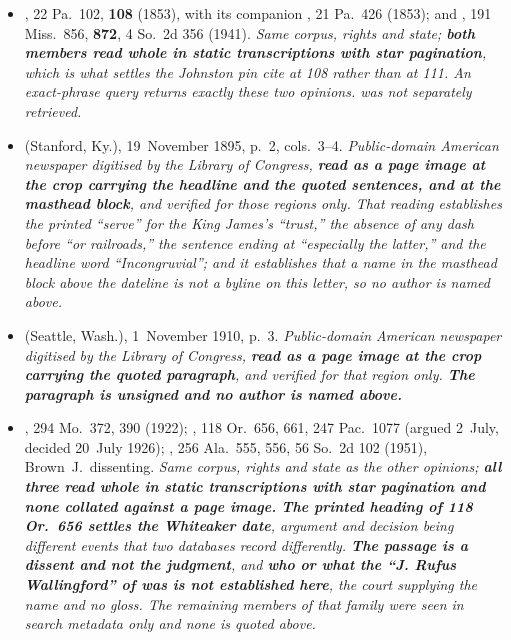 \begin{itemize}[leftmargin=1.2em, itemsep=0.15em]
{Hare and Wallace's Notes to 1  p.~210 are cited
above as the sources those opinions quote and were not separately retrieved.
\textbf{The corpus is overwhelmingly American and no Commonwealth sweep was
performed}; the further opinions quoting the mammon clause were seen in search
metadata only and none is quoted above.}
\item {}, 22 Pa.\ 102, \textbf{108} (1853),
with its companion , 21 Pa.\ 426 (1853); and
, 191 Miss.\ 856, \textbf{872}, 4 So.\ 2d 356 (1941).
\textit{Same corpus, rights and state; \textbf{both members read whole in static
transcriptions with star pagination}, which is what settles the Johnston pin
cite at 108 rather than at 111. An exact-phrase query returns exactly these two
opinions.  was not separately retrieved.}
\item {} (Stanford, Ky.), 19~November 1895,
p.~2, cols.~3--4. \textit{Public-domain American newspaper digitised by the
Library of Congress, \textbf{read as a page image at the crop carrying the
headline and the quoted sentences, and at the masthead block}, and
\emph{verified} for those regions only. That reading establishes the printed
``serve'' for the King James's ``trust,'' the absence of any dash before ``or
railroads,'' the sentence ending at ``especially the latter,'' and the headline
word ``Incongruvial''; and it establishes that a name in the masthead block
above the dateline is not a byline on this letter, so no author is named above.}
\item {} (Seattle, Wash.), 1~November 1910, p.~3.
\textit{Public-domain American newspaper digitised by the Library of Congress,
\textbf{read as a page image at the crop carrying the quoted paragraph}, and
\emph{verified} for that region only. \textbf{The paragraph is unsigned and no
author is named above.}}
\item {}, 294 Mo.\ 372, 390 (1922); , 118 Or.\ 656, 661, 247 Pac.\ 1077 (argued 2~July, decided 20~July
1926); , 256 Ala.\ 555, 556, 56 So.\
2d 102 (1951), Brown~J.\ dissenting. \textit{Same corpus, rights and state as
the other opinions; \textbf{all three read whole in static transcriptions with
star pagination and none collated against a page image.} \textbf{The printed
heading of 118 Or.\ 656 settles the Whiteaker date}, argument and decision being
different events that two databases record differently. \textbf{The
\work{McPeters} passage is a dissent and not the judgment}, and \textbf{who or
what the ``J. Rufus Wallingford'' of \work{Whiteaker} was is not established
here}, the court supplying the name and no gloss. The remaining members of that
family were seen in search metadata only and none is quoted above.}
\end{itemize}
